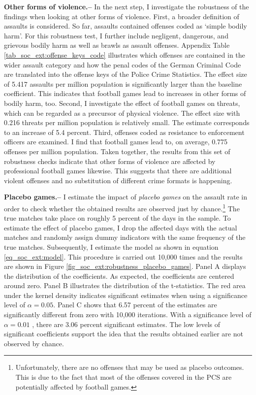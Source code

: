 \textbf{Other forms of violence.--} In the next step, I investigate the robustness of the findings when looking at other forms of violence. First, a broader definition of assaults is considered. So far, assaults contained offenses coded as `simple bodily harm'. For this robustness test, I further include negligent, dangerous, and grievous bodily harm as well as brawls as assault offenses. Appendix Table \ref{tab_soc_ext:offense_keys_code} illustrates which offenses are contained in the wider assault category and how the penal codes of the German Criminal Code are translated into the offense keys of the Police Crime Statistics. The effect size of 5.417 assaults per million population is significantly larger than the baseline coefficient. This indicates that football games lead to increases in other forms of bodily harm, too. Second, I investigate the effect of football games on threats, which can be regarded as a precursor of physical violence. The effect size with 0.216 threats per million population is relatively small. The estimate corresponds to an increase of 5.4 percent. Third, offenses coded as resistance to enforcement officers are examined. I find that football games lead to, on average, 0.775 offenses per million population. Taken together, the results from this set of robustness checks indicate that other forms of violence are affected by professional football games likewise. This suggests that there are additional violent offenses and no substitution of different crime formats is happening.\newline


\textbf{Placebo games.--} I estimate the impact of \textit{placebo games} on the assault rate in order to check whether the obtained results are observed just by chance.\footnote{Unfortunately, there are no offenses that may be used as placebo outcomes. This is due to the fact that most of the offenses covered in the PCS are potentially affected by football games.} The true matches take place on roughly 5 percent of the days in the sample. To estimate the effect of placebo games, I drop the affected days with the actual matches and randomly assign dummy indicators with the same frequency of the true matches. Subsequently, I estimate the model as shown in equation \ref{eq_soc_ext:model}. This procedure is carried out 10,000 times and the results are shown in Figure \ref{fig_soc_ext:robustness_placebo_games}. Panel A displays the distribution of the coefficients. As expected, the coefficients are centered around zero. Panel B illustrates the distribution of the t-statistics. The red area under the kernel density indicates significant estimates when using a significance level of $\alpha=0.05$. Panel C shows that 6.57 percent of the estimates are significantly different from zero with 10,000 iterations. With a significance level of $\alpha=0.01$ , there are 3.06 percent significant estimates. The low levels of significant coefficients support the idea that the results obtained earlier are not observed by chance. 



